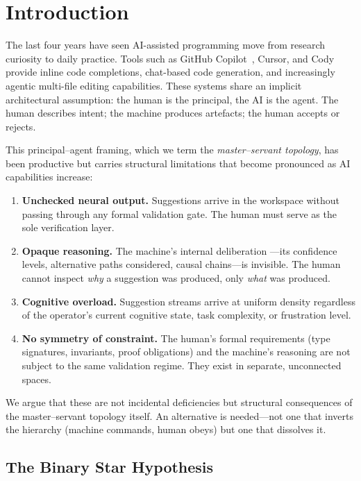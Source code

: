 \documentclass[11pt,a4paper]{article}
\begin{document}
\section{Introduction}\label{sec:intro}

The last four years have seen AI-assisted programming move from
research curiosity to daily practice. Tools such as GitHub
Copilot~\citep{chen2021evaluating}, Cursor, and Cody provide
inline code completions, chat-based code generation, and
increasingly agentic multi-file editing capabilities. These systems
share an implicit architectural assumption: the human is the
principal, the AI is the agent. The human describes intent; the
machine produces artefacts; the human accepts or rejects.

This principal--agent framing, which we term the \textit{master--servant
topology}, has been productive but carries structural limitations
that become pronounced as AI capabilities increase:

\begin{enumerate}[label=(\roman*)]
  \item \textbf{Unchecked neural output.} Suggestions arrive in the
    workspace without passing through any formal validation gate. The
    human must serve as the sole verification layer.
  \item \textbf{Opaque reasoning.} The machine's internal deliberation
    ---its confidence levels, alternative paths considered, causal
    chains---is invisible. The human cannot inspect \textit{why} a
    suggestion was produced, only \textit{what} was produced.
  \item \textbf{Cognitive overload.} Suggestion streams arrive at
    uniform density regardless of the operator's current cognitive
    state, task complexity, or frustration level.
  \item \textbf{No symmetry of constraint.} The human's formal
    requirements (type signatures, invariants, proof obligations) and
    the machine's reasoning are not subject to the same validation
    regime. They exist in separate, unconnected spaces.
\end{enumerate}

We argue that these are not incidental deficiencies but structural
consequences of the master--servant topology itself. An alternative
is needed---not one that inverts the hierarchy (machine commands,
human obeys) but one that dissolves it.

\subsection{The Binary Star Hypothesis}
\end{document}
